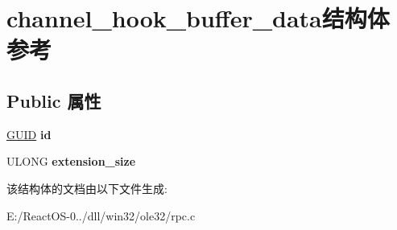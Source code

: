 \hypertarget{structchannel__hook__buffer__data}{}\section{channel\+\_\+hook\+\_\+buffer\+\_\+data结构体 参考}
\label{structchannel__hook__buffer__data}
\subsection*{Public 属性}
\begin{DoxyCompactItemize}
\item 
\mbox{\label{structchannel__hook__buffer__data_ae49bc466cf937b8a3b69d079e503bc66}} 
\hyperlink{interface_g_u_i_d}{G\+U\+ID} {\bfseries id}
\item 
\mbox{\label{structchannel__hook__buffer__data_a3c5c37fe459d9eaddb656d9c981881f2}} 
U\+L\+O\+NG {\bfseries extension\+\_\+size}
\end{DoxyCompactItemize}


该结构体的文档由以下文件生成\+:\begin{DoxyCompactItemize}
\item 
E\+:/\+React\+O\+S-\/0../dll/win32/ole32/rpc.\+c\end{DoxyCompactItemize}

